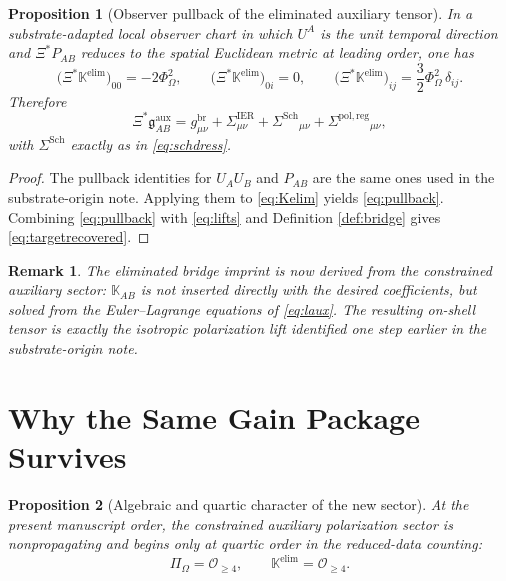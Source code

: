 \documentclass[11pt]{article}
\newcommand{\BridgeMetric}{\mathfrak g}
\newcommand{\ObserverMap}{\Xi}
\newcommand{\ProjSub}{P}
\newcommand{\FlowPot}{\Phi_\Omega}
\newcommand{\BalanceField}{\Pi_\Omega}
\newcommand{\SigmaIER}{\Sigma^{\mathrm{IER}}}
\newcommand{\SigmaRegPol}{\Sigma^{\mathrm{pol,reg}}}
\newcommand{\SigmaDressSch}{\Sigma^{\mathrm{Sch}}}
\newcommand{\AuxPol}{\mathbb K}
\newtheorem{proposition}{Proposition}
\newtheorem{remark}{Remark}
\begin{document}
\begin{proposition}[Observer pullback of the eliminated auxiliary tensor]
\label{prop:pullback}
In a substrate-adapted local observer chart in which \(U^A\) is the unit temporal direction and \(\ObserverMap^*\ProjSub_{AB}\) reduces to the spatial Euclidean metric at leading order, one has
\begin{equation}
\bigl(\ObserverMap^*\AuxPol^{\mathrm{elim}}\bigr)_{00}
=
-2\FlowPot^2,
\qquad
\bigl(\ObserverMap^*\AuxPol^{\mathrm{elim}}\bigr)_{0i}
=
0,
\qquad
\bigl(\ObserverMap^*\AuxPol^{\mathrm{elim}}\bigr)_{ij}
=
\frac32\FlowPot^2\,\delta_{ij}.
\label{eq:pullback}
\end{equation}
Therefore
\begin{equation}
\ObserverMap^*\BridgeMetric^{\mathrm{aux}}_{AB}
=
g_{\mu\nu}^{\mathrm{br}}
+\SigmaIER_{\mu\nu}
+\SigmaDressSch{}_{\mu\nu}
+\SigmaRegPol{}_{\mu\nu},
\label{eq:targetrecovered}
\end{equation}
with \(\SigmaDressSch\) exactly as in \eqref{eq:schdress}.
\end{proposition}

\begin{proof}
The pullback identities for \(U_AU_B\) and \(\ProjSub_{AB}\) are the same ones used in the substrate-origin note. Applying them to \eqref{eq:Kelim} yields \eqref{eq:pullback}. Combining \eqref{eq:pullback} with \eqref{eq:lifts} and Definition \ref{def:bridge} gives \eqref{eq:targetrecovered}.
\end{proof}

\begin{remark}
The eliminated bridge imprint is now derived from the constrained auxiliary sector: \(\AuxPol_{AB}\) is not inserted directly with the desired coefficients, but solved from the Euler--Lagrange equations of \eqref{eq:laux}. The resulting on-shell tensor is exactly the isotropic polarization lift identified one step earlier in the substrate-origin note.
\end{remark}

\section{Why the Same Gain Package Survives}

\begin{proposition}[Algebraic and quartic character of the new sector]
\label{prop:quartic}
At the present manuscript order, the constrained auxiliary polarization sector is nonpropagating and begins only at quartic order in the reduced-data counting:
\begin{equation}
\BalanceField=\mathcal O_{\ge 4},
\qquad
\AuxPol^{\mathrm{elim}}=\mathcal O_{\ge 4}.
\label{eq:quartic}
\end{equation}
\end{proposition}
\end{document}
